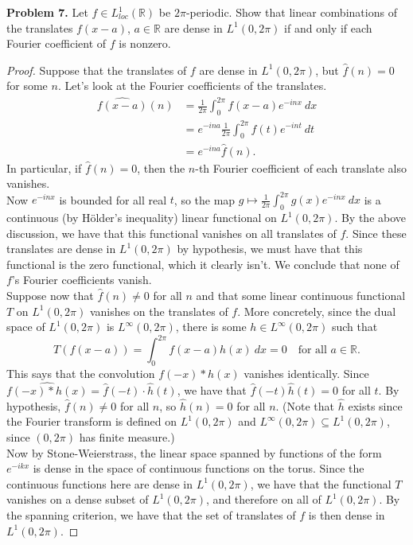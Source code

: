 \documentclass[11pt,letterpaper]{report}
\newcommand{\reals}{\mathbb{R}}
\begin{document}
\noindent\textbf{Problem 7. }
Let $f\in L^1_{loc}(\reals)$ be $2\pi$-periodic. Show that linear combinations of the translates $f(x-a)$, $a\in \reals$ are dense in $L^1(0, 2\pi)$ if and only if each Fourier coefficient of $f$ is nonzero.
\begin{proof}
	Suppose that the translates of $f$ are dense in $L^1(0, 2\pi)$, but $\widehat{f}(n) = 0$ for some $n$. Let's look at the Fourier coefficients of the translates.
	\begin{align*}
	\widehat{f(x-a)}(n) &= \frac{1}{2\pi}\int_0^{2\pi}f(x-a)e^{-inx}\ dx\\
	&= e^{-ina}\frac{1}{2\pi}\int_0^{2\pi}f(t)e^{-int}\ dt\\
	&= e^{-ina}\widehat{f}(n).
	\end{align*}
	In particular, if $\widehat{f}(n) = 0$, then the $n$-th Fourier coefficient of each translate also vanishes.\\

	\noindent Now $e^{-inx}$ is bounded for all real $t$, so the map $g\mapsto \frac{1}{2\pi}\int_0^{2\pi}g(x)e^{-inx}\ dx$ is a continuous (by H\"older's inequality) linear functional on $L^1(0, 2\pi)$. By the above discussion, we have that this functional vanishes on all translates of $f$. Since these translates are dense in $L^1(0, 2\pi)$ by hypothesis, we must have that this functional is the zero functional, which it clearly isn't. We conclude that none of $f$'s Fourier coefficients vanish.\\

	\noindent Suppose now that $\widehat{f}(n)\neq 0$ for all $n$ and that some linear continuous functional $T$ on $L^1(0,2\pi)$ vanishes on the translates of $f$. More concretely, since the dual space of $L^1(0,2\pi)$ is $L^\infty(0,2\pi)$, there is some $h\in L^\infty(0,2\pi)$ such that
	\[
	T(f(x-a)) = \int_0^{2\pi}f(x-a)h(x)\ dx = 0\quad\text{for all }a\in \reals.
	\]
	This says that the convolution $f(-x)*h(x)$ vanishes identically. Since $\widehat{f(-x)*h(x)} = \widehat{f}(-t)\cdot\widehat{h}(t)$, we have that $\widehat{f}(-t)\widehat{h}(t) = 0$ for all $t$. By hypothesis, $\widehat{f}(n)\neq 0$ for all $n$, so $\widehat{h}(n) = 0$ for all $n$. (Note that $\widehat{h}$ exists since the Fourier transform is defined on $L^1(0,2\pi)$ and $L^\infty(0,2\pi)\subseteq L^1(0,2\pi)$, since $(0,2\pi)$ has finite measure.)\\

	\noindent Now by Stone-Weierstrass, the linear space spanned by functions of the form $e^{-ikx}$ is dense in the space of continuous functions on the torus. Since the continuous functions here are dense in $L^1(0,2\pi)$, we have that the functional $T$ vanishes on a dense subset of $L^1(0,2\pi)$, and therefore on all of $L^1(0,2\pi)$. By the spanning criterion, we have that the set of translates of $f$ is then dense in $L^1(0,2\pi)$.
\end{proof}
\end{document}
